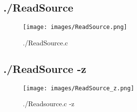 \documentclass{scrartcl}
\begin{document}
\subsection{./ReadSource}
\begin{figure}[H]
  \centering
  \texttt{[image: images/ReadSource.png]}
  \caption{./ReadSource.c}
  \label{fig:digraph}
\end{figure}
\subsection{./ReadSource -z}
\begin{figure}[H]
  \centering
  \texttt{[image: images/ReadSource\_z.png]}
  \caption{./Readsource.c -z}
  \label{fig:digraph}
\end{figure}
\end{document}
